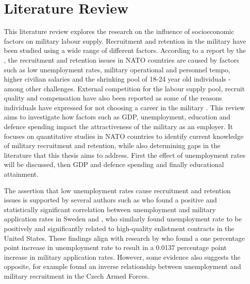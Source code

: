 \chapter{Literature Review}

This literature review explores the research on the influence of socioeconomic 
factors on military labour supply. 
Recruitment and retention in the military have been studied using a wide range of
different factors. According to a report by the \textcite{nato_research_and_technology_organization_recruiting_2007}, 
the recruitment and retention issues in NATO countries are 
caused by factors such as low unemployment rates, military operational and personnel tempo,
higher civilian salaries and the shrinking pool of 18-24 year old individuals - among 
other challenges. External
competition for the labour supply pool, recruit quality and compensation have also been 
reported as some of the reasons
individuals have expressed for not choosing a career in the military \parencite{nato_research_and_technology_organization_recruiting_2007}.
This review aims to investigate how 
factors such as GDP, unemployment, education and defence spending impact the 
attractiveness of the military as an employer. It focuses 
on quantitative studies in NATO countries to identify 
current knowledge of military recruitment and retention, while also determining 
gaps in the literature that this thesis aims to address. 
First the effect of unemployment rates will be discussed, then GDP and defence spending 
and finally educational attainment.

The assertion that low unemployment rates 
cause recruitment and retention issues is supported by several authors such as 
\textcite{backstrom_are_2019} who found a positive and statistically significant correlation 
between unemployment and military application rates in Sweden and \textcite{asch_cash_2010},
who similarly found unemployment rate to be positively and significantly related to
high-quality enlistment contracts in the United States. These findings align with 
research by \textcite{balcaen_unemployment_2025} who found a one percentage point increase in 
unemployment rate to result in a 0.0137 percentage point increase in military 
application rates. However, some evidence also suggests the opposite, for example 
\textcite{holcner_military_2021} found an inverse relationship between unemployment and military 
recruitment in the Czech Armed Forces.

